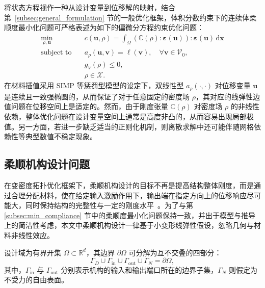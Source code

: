 将状态方程视作一种从设计变量到位移解的映射，结合第~\ref{subsec:general_formulation} 节的一般优化框架，体积分数约束下的连续体柔顺度最小化问题可严格表述为如下的偏微分方程约束优化问题：
\begin{equation} \label{eq:ch6_min_compliance_problem}
	\begin{aligned}
		\min_{\rho,\boldsymbol{u}}\quad&c(\boldsymbol{u}, \rho) = \int_{\Omega}(\mathbb{C}(\rho):\boldsymbol{\varepsilon}(\boldsymbol{u})):\boldsymbol{\varepsilon}(\boldsymbol{u})\,\mathrm{d}\boldsymbol{x}\\
		\text{subject~to}\quad&a_\rho(\boldsymbol{u},\boldsymbol{v}) = \ell(\boldsymbol{v}),\quad\forall\boldsymbol{v}\in\mathcal{V}_0,\\
		&g_V(\rho) \leq 0,\\
		&\rho\in\mathcal{X}.
	\end{aligned}
\end{equation}
在材料插值采用 SIMP 等惩罚型模型的设定下，双线性型 $a_\rho(\cdot,\cdot)$ 对位移变量 $\boldsymbol{u}$ 是连续且一致强椭圆的，从而保证了对于任意固定的密度场 $\rho$，其对应的线弹性边值问题在位移空间上是适定的。然而，由于刚度张量 $\mathbb{C}(\rho)$ 对密度场 $\rho$ 的非线性依赖，整体优化问题在设计变量空间上通常是高度非凸的，从而容易出现局部极值。另一方面，若进一步缺乏适当的正则化机制，则离散求解中还可能伴随网格依赖性等典型数值不稳定现象。


\subsection{柔顺机构设计问题}
\label{subsec:compliant_mechanisms}

在变密度拓扑优化框架下，柔顺机构设计的目标不再是提高结构整体刚度，而是通过合理分配材料，使在给定输入激励作用下，输出端在指定方向上的位移响应尽可能大，同时保持结构的完整性与一定的刚度水平~\cite{bendsoeTopologyOptimization2004a}。为了与第 \ref{subsec:min_compliance} 节中的柔顺度最小化问题保持一致，并出于模型与推导上的简洁性考虑，本文中柔顺机构设计一律基于小变形线弹性假设，忽略几何与材料非线性效应。

设计域为有界开集 $\Omega\subset\mathbb{R}^d$，其边界 $\partial\Omega$ 可分解为互不交叠的四部分：
\[
\Gamma_D \cup \Gamma_{\mathrm{in}} \cup \Gamma_{\mathrm{out}} \cup \Gamma_N = \partial\Omega,
\]
其中，$\Gamma_{\mathrm{in}}$ 与 $\Gamma_{\mathrm{out}}$ 分别表示机构的输入和输出端口所在的边界子集，$\Gamma_N$ 则假定为不受力的自由表面。

